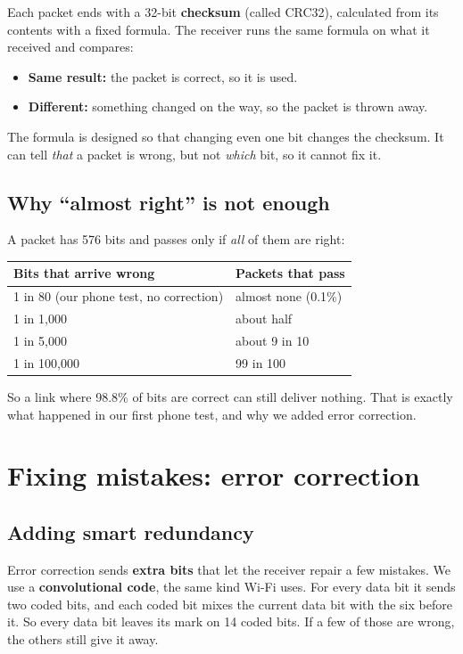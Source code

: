 \documentclass[12pt,a4paper]{article}
\begin{document}
Each packet ends with a 32-bit \textbf{checksum} (called CRC32), calculated
from its contents with a fixed formula. The receiver runs the same formula on
what it received and compares:

\begin{itemize}
\item \textbf{Same result:} the packet is correct, so it is used.
\item \textbf{Different:} something changed on the way, so the packet is thrown away.
\end{itemize}

The formula is designed so that changing even one bit changes the checksum. It
can tell \emph{that} a packet is wrong, but not \emph{which} bit, so it cannot fix it.

\subsection{Why ``almost right'' is not enough}
A packet has 576 bits and passes only if \emph{all} of them are right:

\begin{center}
\begin{tabular}{@{}ll@{}}
\toprule
Bits that arrive wrong & Packets that pass \\
\midrule
1 in 80 (our phone test, no correction) & almost none (0.1\%) \\
1 in 1,000 & about half \\
1 in 5,000 & about 9 in 10 \\
1 in 100,000 & 99 in 100 \\
\bottomrule
\end{tabular}
\end{center}

So a link where 98.8\% of bits are correct can still deliver nothing. That is
exactly what happened in our first phone test, and why we added error correction.

\section{Fixing mistakes: error correction}

\subsection{Adding smart redundancy}
Error correction sends \textbf{extra bits} that let the receiver repair a few
mistakes. We use a \textbf{convolutional code}, the same kind Wi-Fi uses. For
every data bit it sends two coded bits, and each coded bit mixes the current
data bit with the six before it. So every data bit leaves its mark on 14 coded
bits. If a few of those are wrong, the others still give it away.
\end{document}
